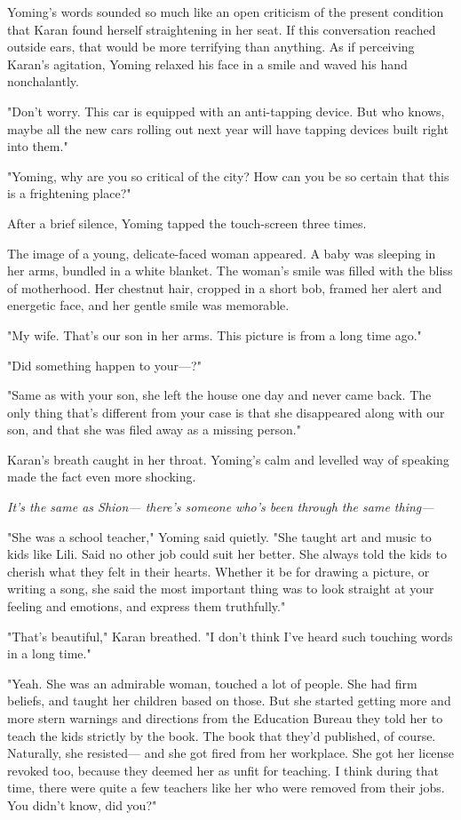 Yoming's words sounded so much like an open criticism of the present
condition that Karan found herself straightening in her seat. If this
conversation reached outside ears, that would be more terrifying than
anything. As if perceiving Karan's agitation, Yoming relaxed his face in
a smile and waved his hand nonchalantly.

"Don't worry. This car is equipped with an anti-tapping device. But who
knows, maybe all the new cars rolling out next year will have tapping
devices built right into them."

"Yoming, why are you so critical of the city? How can you be so certain
that this is a frightening place?"

After a brief silence, Yoming tapped the touch-screen three times.

The image of a young, delicate-faced woman appeared. A baby was sleeping
in her arms, bundled in a white blanket. The woman's smile was filled
with the bliss of motherhood. Her chestnut hair, cropped in a short bob,
framed her alert and energetic face, and her gentle smile was memorable.

"My wife. That's our son in her arms. This picture is from a long time
ago."

"Did something happen to your---?"

"Same as with your son, she left the house one day and never came back.
The only thing that's different from your case is that she disappeared
along with our son, and that she was filed away as a missing person."

Karan's breath caught in her throat. Yoming's calm and levelled way of
speaking made the fact even more shocking.

\emph{It's the same as Shion--- there's someone who's been through the same
thing---}

"She was a school teacher," Yoming said quietly. "She taught art and
music to kids like Lili. Said no other job could suit her better. She
always told the kids to cherish what they felt in their hearts. Whether
it be for drawing a picture, or writing a song, she said the most
important thing was to look straight at your feeling and emotions, and
express them truthfully."

"That's beautiful," Karan breathed. "I don't think I've heard such
touching words in a long time."

"Yeah. She was an admirable woman, touched a lot of people. She had firm
beliefs, and taught her children based on those. But she started getting
more and more stern warnings and directions from the Education Bureau\el 
they told her to teach the kids strictly by the book. The book that
they'd published, of course. Naturally, she resisted--- and she got fired
from her workplace. She got her license revoked too, because they deemed
her as unfit for teaching. I think during that time, there were quite a
few teachers like her who were removed from their jobs. You didn't know,
did you?"

